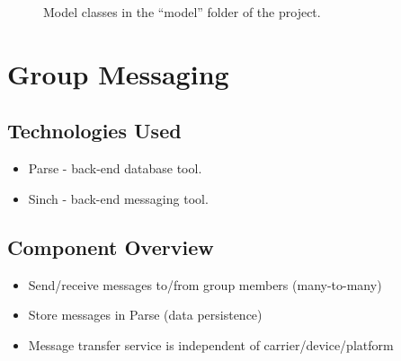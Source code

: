 	\begin{figure}[tbh!]
	\begin{center}
	\end{center}
	\caption{Model classes in the ``model'' folder of the project. \label{ViewsFolder}}
	\end{figure}

\section{Group Messaging }

\subsection{Technologies  Used}
\begin{itemize}
  \item Parse - back-end database tool.
  \item Sinch - back-end messaging tool.
\end{itemize}

\subsection{Component  Overview}
\begin{itemize}
  \item Send/receive messages to/from group members (many-to-many)
  \item Store messages in Parse (data persistence)
  \item Message transfer service is independent of carrier/device/platform
\end{itemize} 

